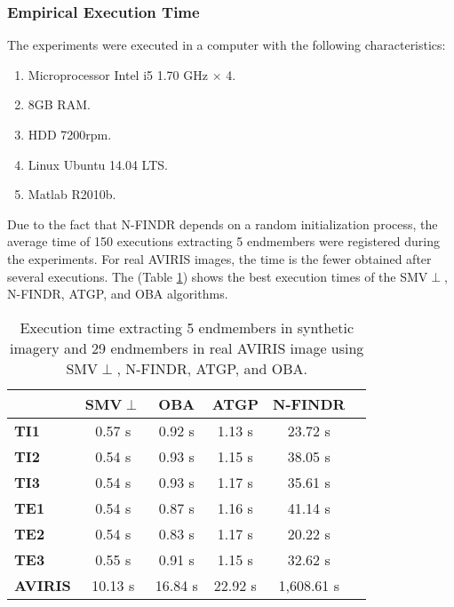 \documentclass[11pt, oneside]{Thesis} %
\begin{document}
\subsubsection{Empirical Execution Time}

\label{sibsectionEmpiricalExecutionTime}

The experiments were executed in a computer with the following characteristics:

\begin{enumerate}
  \item Microprocessor Intel i5 1.70 GHz $\times$ 4.
  \item 8GB RAM.
  \item HDD 7200rpm.
  \item Linux Ubuntu 14.04 LTS.
  \item Matlab R2010b.\\
\end{enumerate}

Due to the fact that N-FINDR depends on a random initialization process, the 
average time of 150 executions extracting 5 endmembers were registered during 
the experiments. For real AVIRIS images, the time is the fewer obtained after 
several executions. The (Table \ref{TableExecutionTime}) shows the best execution 
times of the SMV$\perp$, N-FINDR, ATGP, and OBA algorithms. \\

\begin{table}[ht]		
  \begin{center}
    \begin{tabular}{  l  c  c  c  c  c  }
	    \hline    
    & \textbf{SMV$\perp$} & \textbf{OBA} & \textbf{ATGP} & \textbf{N-FINDR} \\ \hline
    \textbf{TI1}    & 0.57 s  & 0.92 s   & 1.13 s   & 23.72 s 	 \\ 
    \textbf{TI2}    & 0.54 s  & 0.93 s   & 1.15 s   & 38.05 s 	 \\ 
    \textbf{TI3}    & 0.54 s  & 0.93 s   & 1.17 s   & 35.61 s   	 \\ 
    \textbf{TE1}    & 0.54 s  & 0.87 s   & 1.16 s   & 41.14 s  	 \\ 
    \textbf{TE2}    & 0.54 s  & 0.83 s   & 1.17 s   & 20.22 s   	 \\ 
    \textbf{TE3}    & 0.55 s  & 0.91 s   & 1.15 s   & 32.62 s   	 \\ 
    \textbf{AVIRIS} & 10.13 s & 16.84 s  & 22.92 s  & 1,608.61 s  \\  \hline
    \end{tabular}   		  		
    \caption{Execution time extracting 5 endmembers in synthetic imagery and 29 endmembers in real 
    AVIRIS image using SMV$\perp$, N-FINDR, ATGP, and OBA.}
    \label{TableExecutionTime}
  \end{center}
\end{table}
\end{document}
